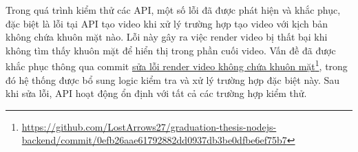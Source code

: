 Trong quá trình kiểm thử các API, một số lỗi đã được phát hiện và khắc phục, đặc biệt là lỗi tại API tạo video khi xử lý trường hợp tạo video với kịch bản không chứa khuôn mặt nào. Lỗi này gây ra việc render video bị thất bại khi không tìm thấy khuôn mặt để hiển thị trong phần cuối video. Vấn đề đã được khắc phục thông qua commit \href{https://github.com/LostArrows27/graduation-thesis-nodejs-backend/commit/0efb26aae61792882dd0937db3be0dfbe6ef75b7}{sửa lỗi render video không chứa khuôn mặt}\footnote{\url{https://github.com/LostArrows27/graduation-thesis-nodejs-backend/commit/0efb26aae61792882dd0937db3be0dfbe6ef75b7}}, trong đó hệ thống được bổ sung logic kiểm tra và xử lý trường hợp đặc biệt này. Sau khi sửa lỗi, API hoạt động ổn định với tất cả các trường hợp kiểm thử.

